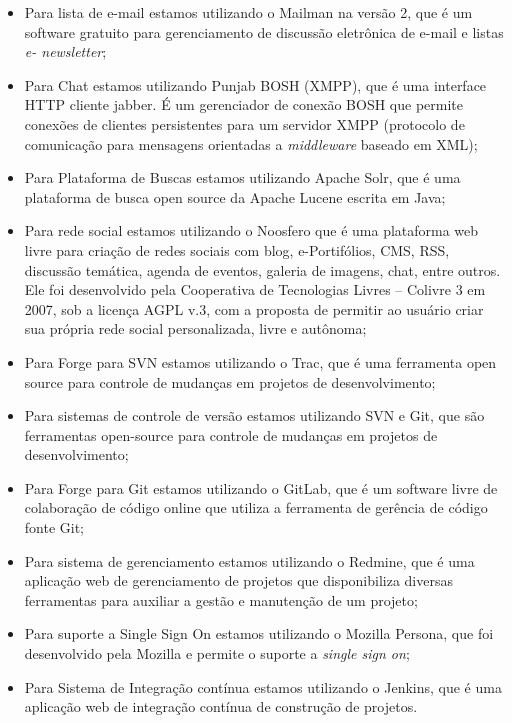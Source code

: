 \begin{itemize}

\item Para lista de e-mail estamos utilizando o Mailman na versão 2, que é um software gratuito para gerenciamento de discussão eletrônica de e-mail e listas {\it e- newsletter};

\item Para Chat estamos utilizando Punjab BOSH (XMPP), que é uma interface HTTP cliente jabber. É um gerenciador de conexão BOSH que permite conexões de clientes persistentes para um servidor XMPP (protocolo de comunicação para mensagens orientadas a {\it middleware} baseado em XML);

\item Para Plataforma de Buscas estamos utilizando Apache Solr, que é uma plataforma de busca open source da Apache Lucene escrita em Java;

\item Para rede social estamos utilizando o Noosfero que é uma plataforma web livre para criação de redes sociais com blog, e-Portifólios, CMS, RSS, discussão temática, agenda de eventos, galeria de imagens, chat, entre outros. Ele foi desenvolvido pela Cooperativa de Tecnologias Livres – Colivre 3 em 2007, sob a licença AGPL v.3, com a proposta de permitir ao usuário criar sua própria rede social personalizada, livre e autônoma;

\item Para Forge para SVN estamos utilizando o Trac, que é uma ferramenta open source para controle de mudanças em projetos de desenvolvimento;

\item Para sistemas de controle de versão estamos utilizando SVN e Git, que são ferramentas open-source para controle de mudanças em projetos de desenvolvimento;

\item Para Forge para Git estamos utilizando o GitLab, que é um software livre de colaboração de código online que utiliza a ferramenta de gerência de código fonte Git;

\item Para sistema de gerenciamento estamos utilizando o Redmine, que é uma aplicação web de gerenciamento de projetos que disponibiliza diversas ferramentas para auxiliar a gestão e manutenção de um projeto;

\item Para suporte a Single Sign On estamos utilizando o Mozilla Persona, que foi desenvolvido pela Mozilla e permite o suporte a {\it single sign on};

\item Para Sistema de Integração contínua estamos utilizando o Jenkins, que é uma aplicação web de integração contínua de construção de projetos.

\end{itemize}

